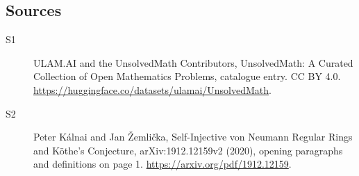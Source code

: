 \documentclass[11pt]{article}
\begin{document}
\subsection{Sources}
\begin{description}
\item[\hypertarget{source:statement:1}{S1}] ULAM.AI and the UnsolvedMath Contributors, UnsolvedMath: A Curated Collection of Open Mathematics Problems, catalogue entry. CC BY 4.0. \url{https://huggingface.co/datasets/ulamai/UnsolvedMath}.
\item[\hypertarget{source:statement:2}{S2}] Peter Kálnai and Jan Žemlička, Self-Injective von Neumann Regular Rings and Köthe’s Conjecture, arXiv:1912.12159v2 (2020), opening paragraphs and definitions on page 1. \url{https://arxiv.org/pdf/1912.12159}.
\end{description}
\label{end:statement}
\end{document}
